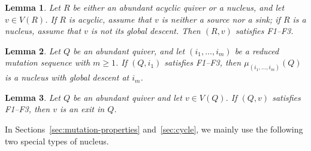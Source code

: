 \documentclass[10pt,a4paper]{amsart}
\newtheorem{lemma}[lemma]{Lemma}
\theoremstyle{definition}
\theoremstyle{definition}
\numberwithin{equation}{section}
\numberwithin{table}{section}
\begin{document}
\begin{lemma}\label{lem:basic-f1-f3}
Let $R$ be either an abundant acyclic quiver or a nucleus, and let
$v\in V(R)$. If $R$ is acyclic, assume that $v$ is neither a source nor a
sink; if $R$ is a nucleus, assume that $v$ is not its global descent. Then
$(R,v)$ satisfies F1--F3.
\end{lemma}

\begin{lemma}\label{lem:mutation-equivalent-nucleus}
Let $Q$ be an abundant quiver, and let $(i_1,\ldots,i_m)$ be a reduced
mutation sequence with $m\geq1$. If $(Q,i_1)$ satisfies F1--F3, then
$\mu_{(i_1,\ldots,i_m)}(Q)$ is a nucleus with global descent at $i_m$.
\end{lemma}

\begin{lemma}\label{lem:f1-f3-exit}
Let $Q$ be an abundant quiver and let $v\in V(Q)$. If $(Q,v)$ satisfies
F1--F3, then $v$ is an exit in $Q$.
\end{lemma}

In Sections~\ref{sec:mutation-properties} and~\ref{sec:cycle}, we mainly use
the following two special types of nucleus.
\end{document}
